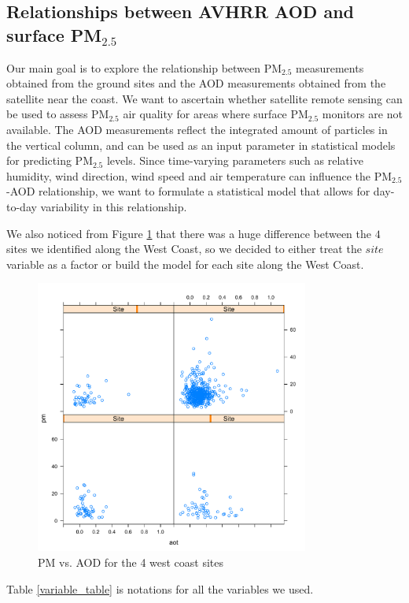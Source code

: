 \documentclass[10pt]{article}
\begin{document}
\subsection{Relationships between AVHRR AOD and surface PM$_{2.5}$}

Our main goal is to explore the relationship between PM$_{2.5}$ measurements obtained from the ground sites and the AOD measurements obtained from the satellite near the coast. We want to ascertain whether satellite remote sensing can be used to assess PM$_{2.5}$ air quality for areas where surface PM$_{2.5}$  monitors are not available. The AOD measurements reflect the integrated amount of particles in the vertical column, and can be used as an input parameter in statistical models for predicting PM$_{2.5}$ levels. Since time-varying parameters such as relative humidity, wind direction, wind speed and air temperature can influence the PM$_{2.5}$-AOD relationship, we want to formulate a statistical model that allows for day-to-day variability in this relationship.  

We also noticed from Figure \ref{fig:pm_vs_aod_west_four} that there was a huge difference between the $4$ sites we identified along the West Coast, so we decided to either treat the $site$ variable as a factor or build the model for each site along the West Coast. 

\begin{figure}[!h]
\centering
\includegraphics[width = 90mm]{3.pdf}
\caption{PM vs. AOD for the 4 west coast sites}
\label{fig:pm_vs_aod_west_four}
\end{figure}

Table \ref{variable_table} is notations for all the variables we used. 
\end{document}
